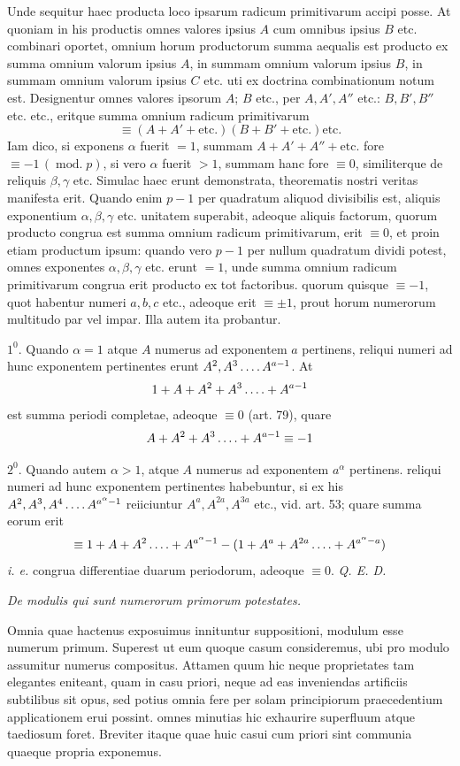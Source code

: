 Unde sequitur haec producta loco ipsarum radicum primitivarum accipi posse. At quoniam in his productis omnes valores ipsius $A$ cum omnibus ipsius $B$ etc. combinari oportet, omnium horum productorum summa aequalis est producto ex summa omnium valorum ipsius $A$, in summam omnium valorum ipsius $B$, in summam omnium valorum ipsius $C$ etc. uti ex doctrina combinationum notum est. Designentur omnes valores ipsorum $A$; $B$ etc., per $A,A',A''$ etc.: $B,B',B''$ etc. etc., eritque summa omnium radicum primitivarum
\[\equiv(A+A'+\text{etc.})(B+B'+\text{etc.})\text{etc.}\]
Iam dico, si exponens $\alpha$ fuerit $=1$, summam $A+A'+A''+\text{etc.}$ fore $\equiv-1\,(\operatorname{mod.}p)$, si vero $\alpha$ fuerit $>1$, summam hanc fore $\equiv0$, similiterque de reliquis $\beta,\gamma$ etc. Simulac haec erunt demonstrata, theorematis nostri veritas
manifesta erit. Quando enim $p-1$ per quadratum aliquod divisibilis est, aliquis exponentium $\alpha,\beta,\gamma$ etc. unitatem superabit, adeoque aliquis factorum, quorum producto congrua est summa omnium radicum primitivarum, erit $\equiv0$, et proin etiam productum ipsum: quando vero $p-1$ per nullum quadratum dividi potest, omnes exponentes $\alpha,\beta,\gamma$ etc. erunt $=1$, unde summa omnium radicum primitivarum congrua erit producto ex tot factoribus. quorum quisque $\equiv-1$, quot habentur numeri $a,b,c$ etc., adeoque erit $\equiv\pm1$, prout horum numerorum multitudo par vel impar. Illa autem ita probantur.

$1^0$. Quando $\alpha=1$ atque $A$ numerus ad exponentem $a$ pertinens, reliqui numeri ad hunc exponentem pertinentes erunt $A^2,A^3\mathinner{\ldotp\ldotp\ldotp\ldotp} A^{a-1}$. At
\[1+A+A^2+A^3\mathinner{\ldotp\ldotp\ldotp\ldotp}+A^{a-1}\]
est summa periodi completae, adeoque $\equiv0$ (art. 79), quare
\[A+A^2+A^3\mathinner{\ldotp\ldotp\ldotp\ldotp}+A^{a-1}\equiv-1\]

$2^0$. Quando autem $\alpha>1$, atque $A$ numerus ad exponentem $a^{\alpha}$ pertinens. reliqui numeri ad hunc exponentem pertinentes habebuntur, si ex his $A^2,A^3,A^4\mathinner{\ldotp\ldotp\ldotp\ldotp} A^{a^{\alpha}-1}$ reiiciuntur $A^a,A^{2a},A^{3a}$ etc., vid. art. 53; quare summa eorum erit
\[\equiv1+A+A^2\mathinner{\ldotp\ldotp\ldotp\ldotp}+A^{a^{\alpha}-1}-(1+A^a+A^{2a}\mathinner{\ldotp\ldotp\ldotp\ldotp}+A^{a^{\alpha}-a})\]
\emph{i. e.} congrua differentiae duarum periodorum, adeoque $\equiv0$. \emph{Q. E. D.}

\begin{center}\emph{De modulis qui sunt numerorum primorum potestates.}\end{center}

Omnia quae hactenus exposuimus innituntur suppositioni, modulum esse numerum primum. Superest ut eum quoque casum consideremus, ubi pro modulo assumitur numerus compositus. Attamen quum hic neque proprietates tam elegantes eniteant, quam in casu priori, neque ad eas inveniendas artificiis subtilibus sit opus, sed potius omnia fere per solam principiorum praecedentium applicationem erui possint. omnes minutias hic exhaurire superfluum atque taediosum foret. Breviter itaque quae huic casui cum priori sint communia quaeque propria exponemus.


